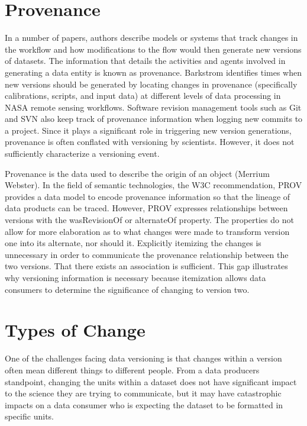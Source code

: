 \section{Provenance}
In a number of papers, authors describe models or systems that track changes in the workflow and how modifications to the flow would then generate new versions of datasets.  The information that details the activities and agents involved in generating a data entity is known as provenance.  Barkstrom identifies times when new versions should be generated by locating changes in provenance (specifically calibrations, scripts, and input data) at different levels of data processing in NASA remote sensing workflows.  Software revision management tools such as Git and SVN also keep track of provenance information when logging new commits to a project.  Since it plays a significant role in triggering new version generations, provenance is often conflated with versioning by scientists.  However, it does not sufficiently characterize a versioning event.

Provenance is the data used to describe the origin of an object (Merrium Webster).  In the field of semantic technologies, the W3C recommendation, PROV provides a data model to encode provenance information so that the lineage of data products can be traced.  However, PROV expresses relationships between versions with the wasRevisionOf or alternateOf property.  The properties do not allow for more elaboration as to what changes were made to transform version one into its alternate, nor should it.  Explicitly itemizing the changes is unnecessary in order to communicate the provenance relationship between the two versions.  That there exists an association is sufficient.  This gap illustrates why versioning information is necessary because itemization allows data consumers to determine the significance of changing to version two.

\section{Types of Change}

One of the challenges facing data versioning is that changes within a version often mean different things to different people.  From a data producers standpoint, changing the units within a dataset does not have significant impact to the science they are trying to communicate, but it may have catastrophic impacts on a data consumer who is expecting the dataset to be formatted in specific units.

